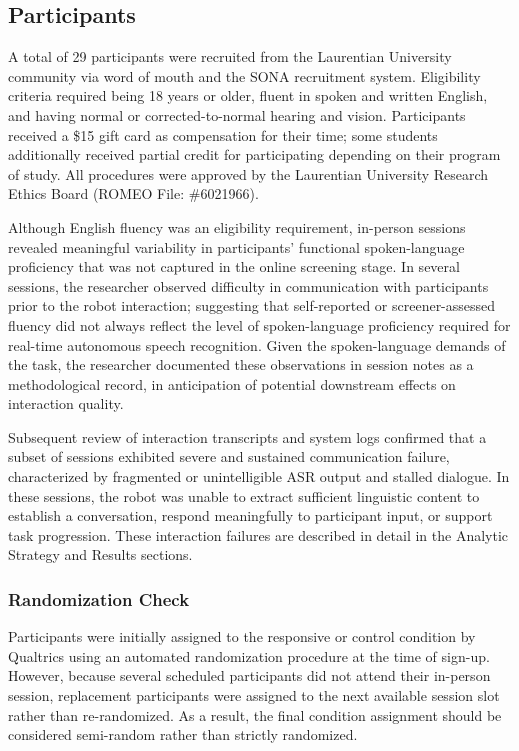 \documentclass[
  authoryear,
  doubleblind,
  3p]{elsarticle}
\begin{document}
\subsection{Participants}\label{sec-participants}

A total of 29 participants were recruited from the Laurentian University
community via word of mouth and the SONA recruitment system. Eligibility
criteria required being 18 years or older, fluent in spoken and written
English, and having normal or corrected-to-normal hearing and vision.
Participants received a \$15 gift card as compensation for their time;
some students additionally received partial credit for participating
depending on their program of study. All procedures were approved by the
Laurentian University Research Ethics Board (ROMEO File: \#6021966).

Although English fluency was an eligibility requirement, in-person
sessions revealed meaningful variability in participants' functional
spoken-language proficiency that was not captured in the online
screening stage. In several sessions, the researcher observed difficulty
in communication with participants prior to the robot interaction;
suggesting that self-reported or screener-assessed fluency did not
always reflect the level of spoken-language proficiency required for
real-time autonomous speech recognition. Given the spoken-language
demands of the task, the researcher documented these observations in
session notes as a methodological record, in anticipation of potential
downstream effects on interaction quality.

Subsequent review of interaction transcripts and system logs confirmed
that a subset of sessions exhibited severe and sustained communication
failure, characterized by fragmented or unintelligible ASR output and
stalled dialogue. In these sessions, the robot was unable to extract
sufficient linguistic content to establish a conversation, respond
meaningfully to participant input, or support task progression. These
interaction failures are described in detail in the Analytic Strategy
and Results sections.

\subsubsection{Randomization Check}\label{randomization-check}

Participants were initially assigned to the responsive or control
condition by Qualtrics using an automated randomization procedure at the
time of sign-up. However, because several scheduled participants did not
attend their in-person session, replacement participants were assigned
to the next available session slot rather than re-randomized. As a
result, the final condition assignment should be considered semi-random
rather than strictly randomized.
\end{document}

